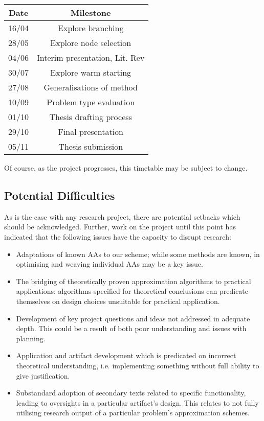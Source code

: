 \documentclass[12pt, a4paper]{article}
\begin{document}
\begin{center}
  \begin{tabular}{||c | c||}
  \hline
  Date & Milestone \\ [0.5ex]
  \hline\hline
  16/04 & Explore branching \\
  \hline
  28/05 & Explore node selection \\
  \hline
  04/06 & Interim presentation, Lit. Rev  \\
  \hline
  30/07 & Explore warm starting \\
  \hline
  27/08 & Generalisations of method \\
  \hline
  10/09 & Problem type evaluation \\
  \hline
  01/10 & Thesis drafting process \\
  \hline
  29/10 & Final presentation \\
  \hline 
  05/11 & Thesis submission \\ [1ex]
  \hline
  \end{tabular}
\end{center}

Of course, as the project progresses, this timetable may be subject to change.

\subsection{Potential Difficulties}
As is the case with any research project, there are potential setbacks which should be acknowledged. Further, work on the project until this point has indicated that the following issues have the capacity to disrupt research:
\begin{itemize}
  \item Adaptations of known AAs to our scheme; while some methods are known, in optimising and weaving individual AAs may be a key issue.
  \item The bridging of theoretically proven approximation algorithms to practical applications: algorithms specified for theoretical conclusions can predicate themselves on design choices unsuitable for practical application.
  \item Development of key project questions and ideas not addressed in adequate depth. This could be a result of both poor understanding and issues with planning.
  \item Application and artifact development which is predicated on incorrect theoretical understanding, i.e. implementing something without full ability to give justification.
  \item Substandard adoption of secondary texts related to specific functionality, leading to oversights in a particular artifact's design. This relates to not fully utilising research output of a particular problem's approximation schemes.
\end{itemize}
\end{document}
